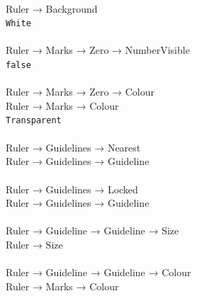 \documentclass[
]{book}
\begin{document}
~\\
Ruler → Background\\
\hspace*{0.333em}\hspace*{0.333em}\hspace*{0.333em}\hspace*{0.333em}\hspace*{0.333em}\texttt{White}\\
~\\
Ruler → Marks → Zero → NumberVisible\\
\hspace*{0.333em}\hspace*{0.333em}\hspace*{0.333em}\hspace*{0.333em}\texttt{false}\\
~\\
Ruler → Marks → Zero → Colour\\
\hspace*{0.333em}\hspace*{0.333em}\hspace*{0.333em}\hspace*{0.333em}Ruler → Marks → Colour\\
\hspace*{0.333em}\hspace*{0.333em}\hspace*{0.333em}\hspace*{0.333em}\hspace*{0.333em}\hspace*{0.333em}\hspace*{0.333em}\hspace*{0.333em}\texttt{Transparent}\\
~\\
Ruler → Guidelines → Nearest\\
\hspace*{0.333em}\hspace*{0.333em}\hspace*{0.333em}\hspace*{0.333em}Ruler → Guidelines → Guideline\\
~\\
Ruler → Guidelines → Locked\\
\hspace*{0.333em}\hspace*{0.333em}\hspace*{0.333em}\hspace*{0.333em}Ruler → Guidelines → Guideline\\
~\\
Ruler → Guideline → Guideline → Size\\
\hspace*{0.333em}\hspace*{0.333em}\hspace*{0.333em}\hspace*{0.333em}\hspace*{0.333em}Ruler → Size\\
~\\
Ruler → Guideline → Guideline → Colour\\
\hspace*{0.333em}\hspace*{0.333em}\hspace*{0.333em}\hspace*{0.333em}\hspace*{0.333em}Ruler → Marks → Colour
\end{document}
